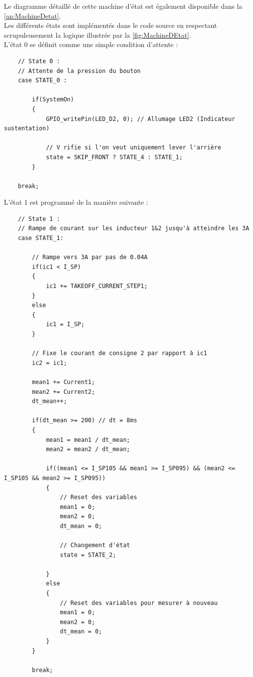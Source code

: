 Le diagramme détaillé de cette machine d'état est également disponible dans la \autoref{an:MachineDetat}.\\

Les différents états sont implémentés dans le code source en respectant scrupuleusement la logique illustrée par la \autoref{fig:MachineDEtat}.\\

L'état 0 se définit comme une simple condition d'attente :

\begin{verbatim}
    // State 0 :
    // Attente de la pression du bouton
    case STATE_0 :

        if(SystemOn)
        {
            GPIO_writePin(LED_D2, 0); // Allumage LED2 (Indicateur sustentation)

            // V rifie si l'on veut uniquement lever l'arrière
            state = SKIP_FRONT ? STATE_4 : STATE_1;
        }

    break;
\end{verbatim}

L'état 1 est programmé de la manière suivante :

\begin{verbatim}
    // State 1 :
    // Rampe de courant sur les inducteur 1&2 jusqu'à atteindre les 3A
    case STATE_1:

        // Rampe vers 3A par pas de 0.04A
        if(ic1 < I_SP)
        {
            ic1 += TAKEOFF_CURRENT_STEP1;
        }
        else
        {
            ic1 = I_SP;
        }

        // Fixe le courant de consigne 2 par rapport à ic1
        ic2 = ic1;

        mean1 += Current1;
        mean2 += Current2;
        dt_mean++;

        if(dt_mean >= 200) // dt = 8ms
        {
            mean1 = mean1 / dt_mean;
            mean2 = mean2 / dt_mean;

            if((mean1 <= I_SP105 && mean1 >= I_SP095) && (mean2 <= I_SP105 && mean2 >= I_SP095))
            {
                // Reset des variables
                mean1 = 0;
                mean2 = 0;
                dt_mean = 0;

                // Changement d'état
                state = STATE_2;

            }
            else
            {
                // Reset des variables pour mesurer à nouveau
                mean1 = 0;
                mean2 = 0;
                dt_mean = 0;
            }
        }

        break;
\end{verbatim}

